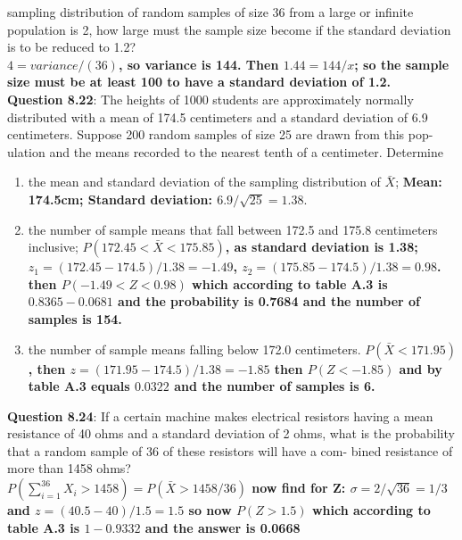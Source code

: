 \documentclass{article}
\begin{document}
    sampling distribution of random samples of size 36
    from a large or infinite population is 2, how large must
    the sample size become if the standard deviation is to
    be reduced to 1.2?\\\newline
        \textbf{$4=variance/(36)$, so variance is 144. Then $1.44=144/x$;
        so the sample size must be at least 100 to have a standard deviation of 
        1.2.}\\\newline
    \textbf{Question 8.22}: The heights of 1000 students are approximately
    normally distributed with a mean of 174.5 centimeters
    and a standard deviation of 6.9 centimeters. Suppose
    200 random samples of size 25 are drawn from this pop-
    ulation and the means recorded to the nearest tenth of
    a centimeter. Determine
        \begin{enumerate}[label = (\alph*) ]
            \item the mean and standard deviation of the sampling
            distribution of $\bar{X}$;\newline
            \textbf{Mean: 174.5cm; Standard deviation: $6.9/\sqrt{25} = 1.38$}.
            \item the number of sample means that fall between 172.5
            and 175.8 centimeters inclusive;\newline
            \textbf{$P(172.45 < \bar{X} < 175.85)$, as standard deviation is 1.38;
            $z_1 = (172.45-174.5)/1.38 = -1.49$, $z_2 = (175.85-174.5)/1.38 = 0.98$.
            then $P(-1.49 < Z < 0.98)$ which according to table A.3 is $0.8365-0.0681$
             and the probability is 0.7684 and the number of samples is 154.}
            \item the number of sample means falling below 172.0
            centimeters.\newline
            \textbf{$P(\bar{X} < 171.95)$, then $z = (171.95-174.5)/1.38 = -1.85$
            then $P(Z < -1.85)$ and by table A.3 equals $0.0322$ and the number of 
             samples is 6.}
        \end{enumerate}
    \textbf{Question 8.24}: If a certain machine makes electrical resistors
    having a mean resistance of 40 ohms and a standard
    deviation of 2 ohms, what is the probability that a
    random sample of 36 of these resistors will have a com-
    bined resistance of more than 1458 ohms?\\\newline
    \textbf{$P(\sum_{i=1}^{36}X_i > 1458) = P(\bar{X} > 1458/36)$ now find for Z:
    $ \sigma = 2/\sqrt{36} = 1/3$ and $z=(40.5 - 40)/1.5 = 1.5$ so now $P(Z > 1.5)$
    which according to table A.3 is $1-0.9332$ and the answer is 0.0668}\\\newline
\end{document}
